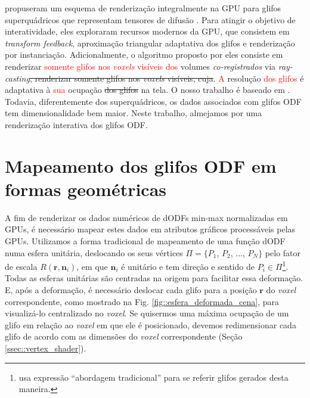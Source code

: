  propuseram um esquema de renderização integralmente na GPU para glifos superquádricos que representam tensores de difusão \cite{Kindlmann2004}. Para atingir o objetivo de interatividade, eles exploraram recursos modernos da GPU, que consistem em \textit{transform feedback}, aproximação triangular adaptativa dos glifos e renderização por instanciação. Adicionalmente, o algoritmo proposto por eles consiste em renderizar \textcolor{red}{somente glifos nos \textit{voxels} visíveis dos} volumes \textit{co-registrados} via \textit{ray-casting}\sout{, renderizar somente glifos nos \textit{voxels} visíveis, cuja}. \textcolor{red}{A} resolução \textcolor{red}{dos glifos} 
é adaptativa à \textcolor{red}{sua} ocupação \sout{dos glifos} na tela. O nosso trabalho é baseado em . Todavia, diferentemente dos superquádricos, os dados associados com glifos ODF tem dimensionalidade bem maior. Neste trabalho, almejamos por uma renderização interativa dos glifos ODF.

\section{Mapeamento dos glifos ODF em formas geométricas}
\label{sec::renderizacao_de_glifos_ODF}


A fim de renderizar os dados numéricos de dODFs min-max normalizadas em GPUs, é necessário mapear estes dados em atributos gráficos processáveis pelas GPUs. Utilizamos a forma tradicional de mapeamento de uma função dODF numa esfera unitária, deslocando os seus vértices $\Pi = \{
P_1$,
$P_2$, ...,
$P_N
\}$
pelo fator de escala $R(\mathbf{r}, \mathbf{n}_i)$, em que $\mathbf{n}_i$ é unitário e tem direção e sentido de $P_i \in \Pi$\footnote{ usa expressão ``abordagem tradicional'' para se referir glifos gerados desta maneira.}. Todas as esferas unitárias são centradas na origem para facilitar essa deformação. E, após a deformação, é necessário deslocar cada glifo para a posição $\mathbf{r}$ do \textit{voxel} correspondente, como mostrado na Fig. \ref{fig::esfera_deformada_cena}, para visualizá-lo centralizado no \textit{voxel}. Se quisermos uma máxima ocupação de um glifo em relação ao \textit{voxel} em que ele é posicionado, devemos redimensionar cada glifo de acordo com as dimensões do \textit{voxel} correspondente (Seção \ref{ssec::vertex_shader}).

